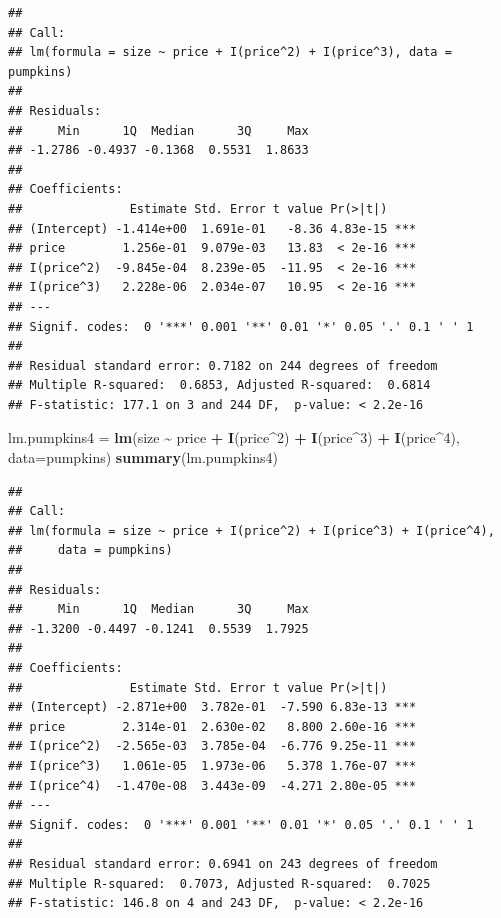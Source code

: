 \documentclass[
]{book}
\newenvironment{Shaded}{\begin{snugshade}}{\end{snugshade}}
\newcommand{\AttributeTok}[1]{\textcolor[rgb]{0.13,0.29,0.53}{#1}}
\newcommand{\DecValTok}[1]{\textcolor[rgb]{0.00,0.00,0.81}{#1}}
\newcommand{\FunctionTok}[1]{\textcolor[rgb]{0.13,0.29,0.53}{\textbf{#1}}}
\newcommand{\NormalTok}[1]{#1}
\newcommand{\OtherTok}[1]{\textcolor[rgb]{0.56,0.35,0.01}{#1}}
\newcommand{\SpecialCharTok}[1]{\textcolor[rgb]{0.81,0.36,0.00}{\textbf{#1}}}
\begin{document}
\begin{verbatim}
## 
## Call:
## lm(formula = size ~ price + I(price^2) + I(price^3), data = pumpkins)
## 
## Residuals:
##     Min      1Q  Median      3Q     Max 
## -1.2786 -0.4937 -0.1368  0.5531  1.8633 
## 
## Coefficients:
##               Estimate Std. Error t value Pr(>|t|)    
## (Intercept) -1.414e+00  1.691e-01   -8.36 4.83e-15 ***
## price        1.256e-01  9.079e-03   13.83  < 2e-16 ***
## I(price^2)  -9.845e-04  8.239e-05  -11.95  < 2e-16 ***
## I(price^3)   2.228e-06  2.034e-07   10.95  < 2e-16 ***
## ---
## Signif. codes:  0 '***' 0.001 '**' 0.01 '*' 0.05 '.' 0.1 ' ' 1
## 
## Residual standard error: 0.7182 on 244 degrees of freedom
## Multiple R-squared:  0.6853, Adjusted R-squared:  0.6814 
## F-statistic: 177.1 on 3 and 244 DF,  p-value: < 2.2e-16
\end{verbatim}

\begin{Shaded}
\begin{Highlighting}[]
\NormalTok{lm.pumpkins4 }\OtherTok{=}  \FunctionTok{lm}\NormalTok{(size }\SpecialCharTok{\textasciitilde{}}\NormalTok{ price }\SpecialCharTok{+} \FunctionTok{I}\NormalTok{(price}\SpecialCharTok{\^{}}\DecValTok{2}\NormalTok{) }\SpecialCharTok{+} \FunctionTok{I}\NormalTok{(price}\SpecialCharTok{\^{}}\DecValTok{3}\NormalTok{) }\SpecialCharTok{+} \FunctionTok{I}\NormalTok{(price}\SpecialCharTok{\^{}}\DecValTok{4}\NormalTok{), }\AttributeTok{data=}\NormalTok{pumpkins)}
\FunctionTok{summary}\NormalTok{(lm.pumpkins4)}
\end{Highlighting}
\end{Shaded}

\begin{verbatim}
## 
## Call:
## lm(formula = size ~ price + I(price^2) + I(price^3) + I(price^4), 
##     data = pumpkins)
## 
## Residuals:
##     Min      1Q  Median      3Q     Max 
## -1.3200 -0.4497 -0.1241  0.5539  1.7925 
## 
## Coefficients:
##               Estimate Std. Error t value Pr(>|t|)    
## (Intercept) -2.871e+00  3.782e-01  -7.590 6.83e-13 ***
## price        2.314e-01  2.630e-02   8.800 2.60e-16 ***
## I(price^2)  -2.565e-03  3.785e-04  -6.776 9.25e-11 ***
## I(price^3)   1.061e-05  1.973e-06   5.378 1.76e-07 ***
## I(price^4)  -1.470e-08  3.443e-09  -4.271 2.80e-05 ***
## ---
## Signif. codes:  0 '***' 0.001 '**' 0.01 '*' 0.05 '.' 0.1 ' ' 1
## 
## Residual standard error: 0.6941 on 243 degrees of freedom
## Multiple R-squared:  0.7073, Adjusted R-squared:  0.7025 
## F-statistic: 146.8 on 4 and 243 DF,  p-value: < 2.2e-16
\end{verbatim}
\end{document}
